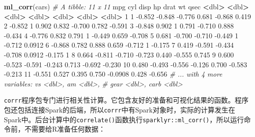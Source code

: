 \documentclass[
]{article}
\newenvironment{Shaded}{\begin{snugshade}}{\end{snugshade}}
\newcommand{\CommentTok}[1]{\textcolor[rgb]{0.56,0.35,0.01}{\textit{#1}}}
\newcommand{\DecValTok}[1]{\textcolor[rgb]{0.00,0.00,0.81}{#1}}
\newcommand{\ErrorTok}[1]{\textcolor[rgb]{0.64,0.00,0.00}{\textbf{#1}}}
\newcommand{\FloatTok}[1]{\textcolor[rgb]{0.00,0.00,0.81}{#1}}
\newcommand{\KeywordTok}[1]{\textcolor[rgb]{0.13,0.29,0.53}{\textbf{#1}}}
\newcommand{\NormalTok}[1]{#1}
\newcommand{\OperatorTok}[1]{\textcolor[rgb]{0.81,0.36,0.00}{\textbf{#1}}}
\newcommand{\StringTok}[1]{\textcolor[rgb]{0.31,0.60,0.02}{#1}}
\begin{document}
\begin{Shaded}
\begin{Highlighting}[]
\KeywordTok{ml_corr}\NormalTok{(cars)}
\CommentTok{# A tibble: 11 x 11}
\NormalTok{ mpg cyl disp hp drat wt qsec}
 \OperatorTok{<}\NormalTok{dbl}\OperatorTok{>}\StringTok{ }\ErrorTok{<}\NormalTok{dbl}\OperatorTok{>}\StringTok{ }\ErrorTok{<}\NormalTok{dbl}\OperatorTok{>}\StringTok{ }\ErrorTok{<}\NormalTok{dbl}\OperatorTok{>}\StringTok{ }\ErrorTok{<}\NormalTok{dbl}\OperatorTok{>}\StringTok{ }\ErrorTok{<}\NormalTok{dbl}\OperatorTok{>}\StringTok{ }\ErrorTok{<}\NormalTok{dbl}\OperatorTok{>}
\StringTok{ }\DecValTok{1} \DecValTok{1} \FloatTok{-0.852} \FloatTok{-0.848} \FloatTok{-0.776} \FloatTok{0.681} \FloatTok{-0.868} \FloatTok{0.419}
 \DecValTok{2} \FloatTok{-0.852} \DecValTok{1} \FloatTok{0.902} \FloatTok{0.832} \FloatTok{-0.700} \FloatTok{0.782} \FloatTok{-0.591}
 \DecValTok{3} \FloatTok{-0.848} \FloatTok{0.902} \DecValTok{1} \FloatTok{0.791} \FloatTok{-0.710} \FloatTok{0.888} \FloatTok{-0.434}
 \DecValTok{4} \FloatTok{-0.776} \FloatTok{0.832} \FloatTok{0.791} \DecValTok{1} \FloatTok{-0.449} \FloatTok{0.659} \FloatTok{-0.708}
 \DecValTok{5} \FloatTok{0.681} \FloatTok{-0.700} \FloatTok{-0.710} \FloatTok{-0.449} \DecValTok{1} \FloatTok{-0.712} \FloatTok{0.0912}
 \DecValTok{6} \FloatTok{-0.868} \FloatTok{0.782} \FloatTok{0.888} \FloatTok{0.659} \FloatTok{-0.712} \DecValTok{1} \FloatTok{-0.175}
 \DecValTok{7} \FloatTok{0.419} \FloatTok{-0.591} \FloatTok{-0.434} \FloatTok{-0.708} \FloatTok{0.0912} \FloatTok{-0.175} \DecValTok{1}
 \DecValTok{8} \FloatTok{0.664} \FloatTok{-0.811} \FloatTok{-0.710} \FloatTok{-0.723} \FloatTok{0.440} \FloatTok{-0.555} \FloatTok{0.745}
 \DecValTok{9} \FloatTok{0.600} \FloatTok{-0.523} \FloatTok{-0.591} \FloatTok{-0.243} \FloatTok{0.713} \FloatTok{-0.692} \FloatTok{-0.230}
\DecValTok{10} \FloatTok{0.480} \FloatTok{-0.493} \FloatTok{-0.556} \FloatTok{-0.126} \FloatTok{0.700} \FloatTok{-0.583} \FloatTok{-0.213}
\DecValTok{11} \FloatTok{-0.551} \FloatTok{0.527} \FloatTok{0.395} \FloatTok{0.750} \FloatTok{-0.0908} \FloatTok{0.428} \FloatTok{-0.656}
\CommentTok{# ... with 4 more variables: vs <dbl>, am <dbl>,}
\CommentTok{# gear <dbl>, carb <dbl>}
\end{Highlighting}
\end{Shaded}

\texttt{corrr}程序包专门进行相关性计算。它包含友好的准备和可视化结果的函数。程序包还包括连接Spark的后端，所以\texttt{corrr}中有Spark对象时，实际的计算发生在Spark中。后台计算中的\texttt{correlate()}函数执行\texttt{sparklyr::ml\_corr()}，所以运行命令前，不需要给R准备任何数据：
\end{document}
